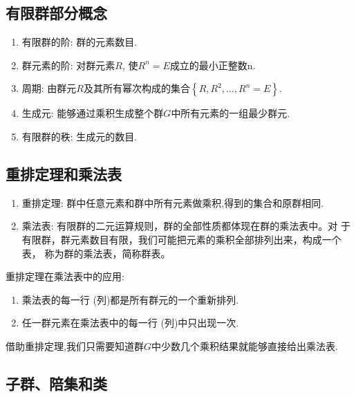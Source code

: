 \documentclass{ctexart}
\begin{document}
\subsection{有限群部分概念}

\begin{enumerate}
    \item 有限群的阶: 群的元素数目.
    \item 群元素的阶: 对群元素$R$, 使$R^{n}=E$成立的最小正整数n.
    \item 周期: 由群元$R$及其所有幂次构成的集合$\left\{R,R^{2},\ldots,R^{n}
=E \right\}$.
    \item 生成元: 能够通过乘积生成整个群$G$中所有元素的一组最少群元.
    \item 有限群的秩: 生成元的数目.
\end{enumerate}

\subsection{重排定理和乘法表}

\begin{enumerate}
    \item 重排定理:  群中任意元素和群中所有元素做乘积,得到的集合和原群相同.
    \item 乘法表: 有限群的二元运算规则，群的全部性质都体现在群的乘法表中。对
    于有限群，群元素数目有限，我们可能把元素的乘积全部排列出来，构成一个表，
    称为群的乘法表，简称群表。
\end{enumerate}

重排定理在乘法表中的应用:
\begin{enumerate}
    \item 乘法表的每一行 (列)都是所有群元的一个重新排列.
    \item 任一群元素在乘法表中的每一行 (列)中只出现一次.
\end{enumerate}

借助重排定理,我们只需要知道群$G$中少数几个乘积结果就能够直接给出乘法表.

\subsection{子群、陪集和类}
\end{document}
